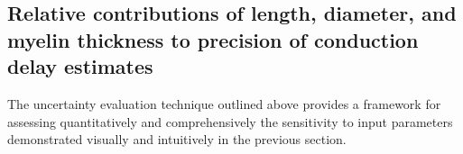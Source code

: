 \subsection{Relative contributions of length, diameter, and myelin thickness to precision of conduction delay estimates}

The uncertainty evaluation technique outlined above provides a framework for assessing quantitatively and comprehensively the sensitivity to input parameters demonstrated visually and intuitively in the previous section. 


